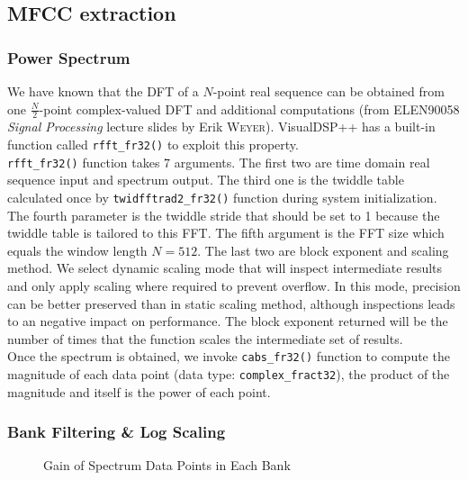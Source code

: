 \subsection{MFCC extraction}
\subsubsection{Power Spectrum}

We have known that the DFT of a $N$-point real sequence can be obtained from one $\frac{N}{2}$-point complex-valued DFT and additional computations (from ELEN90058 \textit{Signal Processing} lecture slides by Erik \textsc{Weyer}). VisualDSP++ has a built-in function called \texttt{rfft\_fr32()} to exploit this property.\\

\texttt{rfft\_fr32()} function takes 7 arguments. The first two are time domain real sequence input and spectrum output. The third one is the twiddle table calculated once by \texttt{twidfftrad2\_fr32()} function during system initialization. The fourth parameter is the twiddle stride that should be set to 1 because the twiddle table is tailored to this FFT. The fifth argument is the FFT size which equals the window length $N = 512$. The last two are block exponent and scaling method. We select dynamic scaling mode that will inspect intermediate results and only apply scaling where required to prevent overflow. In this mode, precision can be better preserved than in static scaling method, although inspections leads to an negative impact on performance. The block exponent returned will be the number of times that the function scales the intermediate set of results.\\

Once the spectrum is obtained, we invoke \texttt{cabs\_fr32()} function to compute the magnitude of each data point (data type: \texttt{complex\_fract32}), the product of the magnitude and itself is the power of each point.


\subsubsection{Bank Filtering \& Log Scaling}

\begin{figure}[H]
\centering
{}
\caption{Gain of Spectrum Data Points in Each Bank}
\label{mel_filter_bank_gain}
\end{figure}

